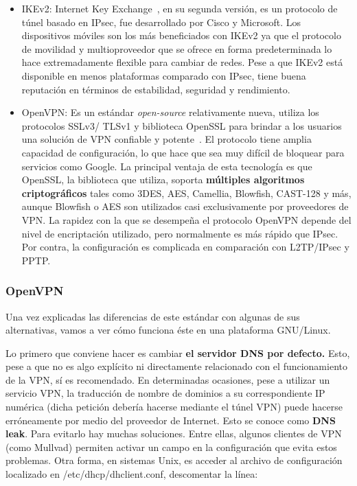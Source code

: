 \begin{itemize}
 	\item IKEv2: Internet Key Exchange~\cite{article:sstp}, en su segunda versión, es un protocolo de túnel basado en IPsec, fue desarrollado por Cisco y Microsoft.
 	Los dispositivos móviles son los más beneficiados con IKEv2 ya que el protocolo de movilidad y multioproveedor que se ofrece en forma predeterminada lo hace extremadamente flexible para cambiar de redes. Pese a que IKEv2 está disponible en menos plataformas comparado con IPsec, tiene buena reputación en términos de estabilidad, seguridad y rendimiento.
 	
 	\item OpenVPN: Es un estándar \textit{open-source }relativamente nueva, utiliza los protocolos SSLv3/ TLSv1 y biblioteca OpenSSL para brindar a los usuarios una solución de VPN confiable y potente~\cite{article:sstp}. El protocolo tiene amplia capacidad de configuración, lo que hace que sea muy difícil de bloquear para servicios como Google.	La principal ventaja de esta tecnología es que OpenSSL, la biblioteca que utiliza, soporta\textbf{ múltiples algoritmos criptográficos }tales como 3DES, AES, Camellia, Blowfish, CAST-128 y más, aunque Blowfish o AES son utilizados casi exclusivamente por proveedores de VPN.
 	La rapidez con la que se desempeña el protocolo OpenVPN depende del nivel de encriptación utilizado, pero normalmente es más rápido que IPsec. Por contra, la configuración es complicada en comparación con L2TP/IPsec y PPTP.
 \end{itemize}
 
 \subsubsection{OpenVPN}
 
	Una vez explicadas las diferencias de este estándar con algunas de sus alternativas, vamos a ver cómo funciona éste en una plataforma GNU/Linux.
	
	Lo primero que conviene hacer es cambiar \textbf{el servidor DNS por defecto.}
	Esto, pese a que no es algo explícito ni directamente relacionado con el funcionamiento de la VPN, sí es recomendado. En determinadas ocasiones, pese a utilizar un servicio VPN, la traducción de nombre de dominios a su correspondiente IP numérica (dicha petición debería hacerse mediante el túnel VPN) puede hacerse erróneamente por medio del proveedor de Internet. Esto se conoce como \textbf{DNS leak}. 
	Para evitarlo hay muchas soluciones. Entre ellas, algunos clientes de VPN (como Mullvad) permiten activar un campo en la configuración que evita estos problemas. Otra forma, en sistemas Unix, es acceder al archivo de configuración localizado en /etc/dhcp/dhclient.conf, descomentar la línea:
	
